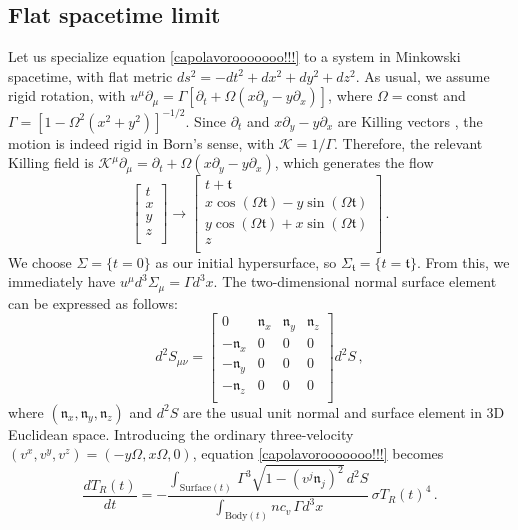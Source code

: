 \documentclass[a4paper, amsfonts, amssymb, amsmath, reprint, showkeys, nofootinbib, twoside, onecolumn,notitlepage]{revtex4-1}
\newcommand{\K}{{\mathcal{K}}}
\theoremstyle{definition}
\theoremstyle{theorem}
\begin{document}
\subsection{Flat spacetime limit}
\vspace{-0.2cm}

Let us specialize equation \eqref{capolavorooooooo!!!} to a system in Minkowski spacetime, with flat metric $ds^2=-dt^2{+}dx^2{+}dy^2{+}dz^2$. As usual, we assume rigid rotation, with $u^\mu \partial_\mu =\Gamma[  \partial_t+\Omega (x \partial_y {-} y \partial_x)]$, where $\Omega=\text{const}$ and $\Gamma=[1-\Omega^2 (x^2{+}y^2)]^{-1/2}$. Since $\partial_t$ and $x \partial_y {-} y \partial_x$ are Killing vectors \cite[\S 3.8]{carroll_2019}, the motion is indeed rigid in Born's sense, with $\K=1/\Gamma$. Therefore, the relevant Killing field is $\K^\mu \partial_\mu =\partial_t+\Omega (x \partial_y {-} y \partial_x)$, which generates the flow
\begin{equation}
\begin{bmatrix}
t\\
x\\
y\\
z\\
\end{bmatrix}
\rightarrow
\begin{bmatrix}
t+\mathfrak{t}\\
x\cos(\Omega \mathfrak{t})-y\sin(\Omega \mathfrak{t})\\
y\cos(\Omega \mathfrak{t})+x\sin(\Omega\mathfrak{t})\\
z \\
\end{bmatrix} \, .
\end{equation}
We choose $\Sigma=\{t{=}0\}$ as our initial hypersurface, so $\Sigma_{\mathfrak{t}}=\{t{=}\mathfrak{t}\}$. From this, we immediately have $u^\mu d^3\Sigma_\mu =\Gamma d^3x$. The two-dimensional normal surface element can be expressed as follows:
\begin{equation}
d^2 S_{\mu \nu} =
\begin{bmatrix}
0 & \mathfrak{n}_x & \mathfrak{n}_y & \mathfrak{n}_z \\
-\mathfrak{n}_x & 0 & 0 & 0 \\
-\mathfrak{n}_y & 0 & 0 & 0 \\
-\mathfrak{n}_z & 0 & 0 & 0 \\
\end{bmatrix} d^2 S \, ,
\end{equation}
where $(\mathfrak{n}_x, \mathfrak{n}_y, \mathfrak{n}_z)$ and $d^2 S$ are the usual unit normal and surface element in 3D Euclidean space. Introducing the ordinary three-velocity $(v^x,v^y,v^z)=(-y\Omega,x\Omega,0)$, equation \eqref{capolavorooooooo!!!} becomes
\begin{equation}\label{capolavoro2}
\dfrac{dT_R(t)}{dt} =- \dfrac{\int_{\text{Surface}(t)} \, \Gamma^3 \sqrt{1{-}(v^j \mathfrak{n}_j)^2} \, d^2 S}{\int_{\text{Body}(t)}  nc_v  \,  \Gamma d^3 x} \, \sigma T_R(t)^4 \,  .
\end{equation}
\end{document}

